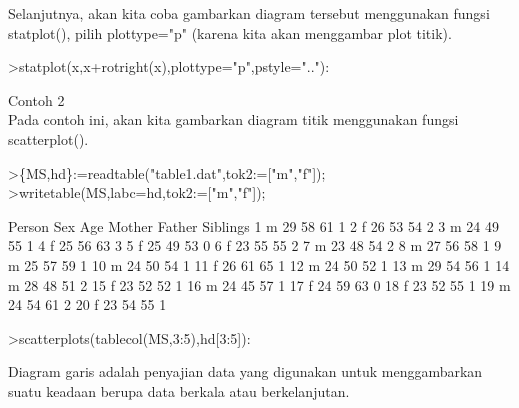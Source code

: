 \documentclass{article}
\begin{document}
\begin{eulernotebook}
\begin{eulercomment}
\begin{eulercomment}
\begin{eulercomment}
Selanjutnya, akan kita coba gambarkan diagram tersebut menggunakan
fungsi statplot(), pilih plottype="p" (karena kita akan menggambar
plot titik).
\end{eulercomment}
\begin{eulerprompt}
>statplot(x,x+rotright(x),plottype="p",pstyle=".."):
\end{eulerprompt}
\begin{eulercomment}
Contoh 2\\
Pada contoh ini, akan kita gambarkan diagram titik menggunakan fungsi
scatterplot().
\end{eulercomment}
\begin{eulerprompt}
>\{MS,hd\}:=readtable("table1.dat",tok2:=["m","f"]);
>writetable(MS,labc=hd,tok2:=["m","f"]);
\end{eulerprompt}
\begin{euleroutput}
      Person       Sex       Age    Mother    Father  Siblings
           1         m        29        58        61         1
           2         f        26        53        54         2
           3         m        24        49        55         1
           4         f        25        56        63         3
           5         f        25        49        53         0
           6         f        23        55        55         2
           7         m        23        48        54         2
           8         m        27        56        58         1
           9         m        25        57        59         1
          10         m        24        50        54         1
          11         f        26        61        65         1
          12         m        24        50        52         1
          13         m        29        54        56         1
          14         m        28        48        51         2
          15         f        23        52        52         1
          16         m        24        45        57         1
          17         f        24        59        63         0
          18         f        23        52        55         1
          19         m        24        54        61         2
          20         f        23        54        55         1
\end{euleroutput}
\begin{eulerprompt}
>scatterplots(tablecol(MS,3:5),hd[3:5]):
\end{eulerprompt}
\begin{eulercomment}
Diagram garis adalah penyajian data yang digunakan untuk menggambarkan
suatu keadaan berupa data berkala atau berkelanjutan.


\end{eulercomment}
\end{eulercomment}
\end{eulercomment}
\end{eulernotebook}
\end{document}
